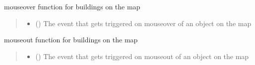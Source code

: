 \documentclass[letterpaper,10pt,english]{sphinxmanual}
\begin{document}
\begin{fulllineitems}
\label{\detokenize{docs_gui/js_api/postcode_editor/display_postcode:highlightBuildingFeature}}
\pysigstartsignatures
{}
\pysigstopsignatures
\sphinxAtStartPar
mouseover function for buildings on the map
\begin{quote}\begin{description}
\begin{itemize}
\item {} 
\sphinxAtStartPar
{} () \textendash{} The event that gets triggered on mouseover of an object on the map

\end{itemize}

\end{description}\end{quote}

\end{fulllineitems}


\begin{fulllineitems}
\label{\detokenize{docs_gui/js_api/postcode_editor/display_postcode:resetBuildingHighlight}}
\pysigstartsignatures
{}
\pysigstopsignatures
\sphinxAtStartPar
mouseout function for buildings on the map
\begin{quote}\begin{description}
\begin{itemize}
\item {} 
\sphinxAtStartPar
{} () \textendash{} The event that gets triggered on mouseout of an object on the map

\end{itemize}

\end{description}\end{quote}

\end{fulllineitems}
\end{document}
